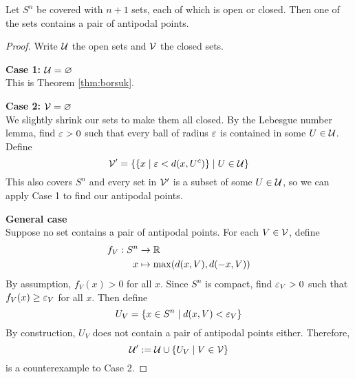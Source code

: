 \documentclass{article}
\begin{document}
\begin{nthm}[Greene]\label{thm:greene}
  Let $S^n$ be covered with $n + 1$ sets, each of which is open or closed. Then one of the sets contains a pair of antipodal points.  
\end{nthm}
\begin{proof}
  Write $\mathcal U$ the open sets and $\mathcal V$ the closed sets.

  {\bf Case 1: $\mathcal U = \varnothing$} \\
  This is Theorem \ref{thm:borsuk}.

  {\bf Case 2: $\mathcal V = \varnothing$} \\
  We slightly shrink our sets to make them all closed. By the Lebesgue number lemma, find $\varepsilon > 0$ such that every ball of radius $\varepsilon$ is contained in some $U \in \mathcal U$. Define
  $$\mathcal V' = \{\{x \mid \varepsilon < d(x, U^c)\} \mid U \in \mathcal U\}$$
  This also covers $S^n$ and every set in $\mathcal V'$ is a subset of some $U \in \mathcal U$, so we can apply Case 1 to find our antipodal points.

  {\bf General case} \\
  Suppose no set contains a pair of antipodal points. For each $V \in \mathcal V$, define
  \begin{align*}
    f_V : S^n & \to \mathbb R \\
    x & \mapsto \max(d(x, V), d(-x, V))
  \end{align*}
  By assumption, $f_V(x) > 0$ for all $x$. Since $S^n$ is compact, find $\varepsilon_V > 0$ such that $f_V(x) \ge \varepsilon_V$ for all $x$. Then define
  $$U_V = \{x \in S^n \mid d(x, V) < \varepsilon_V\}$$
  By construction, $U_V$ does not contain a pair of antipodal points either. Therefore,
  $$\mathcal U' := \mathcal U \cup \{U_V \mid V \in \mathcal V\}$$
  is a counterexample to Case 2.
\end{proof}

\newlec
\end{document}
